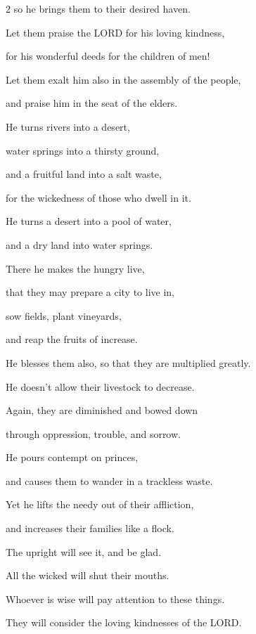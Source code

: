 \begin{multicols}{2}
	so he brings them to their desired haven.
	
	
	\myverse{}Let them praise the LORD for his loving kindness,
	
	for his wonderful deeds for the children of men!
	
	\vspace{\baselineskip}
	
	\myverse{}Let them exalt him also in the assembly of the people,
	
	and praise him in the seat of the elders.
	
	\vspace{\baselineskip}
	
	\myverse{}He turns rivers into a desert,
	
	water springs into a thirsty ground,
	
	
	\myverse{}and a fruitful land into a salt waste,
	
	for the wickedness of those who dwell in it.
	
	
	\myverse{}He turns a desert into a pool of water,
	
	and a dry land into water springs.
	
	
	\myverse{}There he makes the hungry live,
	
	that they may prepare a city to live in,
	
	
	\myverse{}sow fields, plant vineyards,
	
	and reap the fruits of increase.
	
	
	\myverse{}He blesses them also, so that they are multiplied greatly.
	
	He doesn’t allow their livestock to decrease.
	
	
	\myverse{}Again, they are diminished and bowed down
	
	through oppression, trouble, and sorrow.
	
	
	\myverse{}He pours contempt on princes,
	
	and causes them to wander in a trackless waste.
	
	
	\myverse{}Yet he lifts the needy out of their affliction,
	
	and increases their families like a flock.
	
	
	\myverse{}The upright will see it, and be glad.
	
	All the wicked will shut their mouths.
	
	
	\myverse{}Whoever is wise will pay attention to these things.
	
	They will consider the loving kindnesses of the LORD.
	

\end{multicols}
